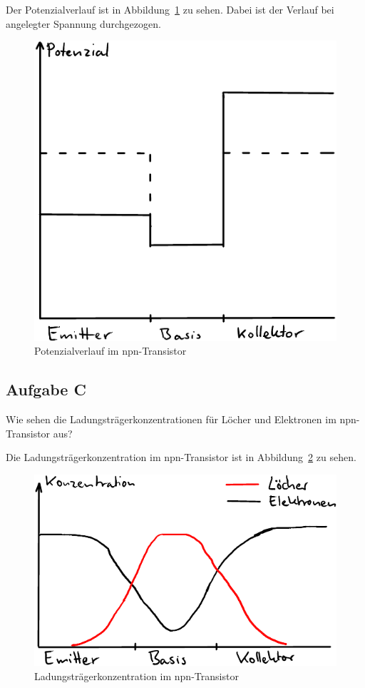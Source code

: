 Der Potenzialverlauf ist in Abbildung~\ref{fig:B_Zeichnung} zu sehen. Dabei ist
der Verlauf bei angelegter Spannung durchgezogen.

\begin{figure}
	\centering
	\includegraphics{Zeichnungen/B_Zeichnung.pdf}
	\caption{%
		Potenzialverlauf im npn-Transistor
	}
	\label{fig:B_Zeichnung}
\end{figure}

\FloatBarrier
\subsection{Aufgabe C}

\begin{problem}
	Wie sehen die Ladungsträgerkonzentrationen für Löcher und Elektronen im
	npn-Transistor aus?
\end{problem}

Die Ladungsträgerkonzentration im npn-Transistor ist in
Abbildung~\ref{fig:C_Zeichnung} zu sehen.

\begin{figure}
	\centering
	\includegraphics{Zeichnungen/C_Zeichnung.pdf}
	\caption{%
		Ladungsträgerkonzentration im npn-Transistor
	}
	\label{fig:C_Zeichnung}
\end{figure}

